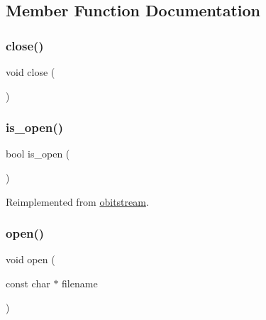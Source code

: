 \subsection{Member Function Documentation}
\mbox{\label{classofbitstream_a5ae591df94fc66ccb85cbb6565368bca}} 
\subsubsection{\texorpdfstring{close()}{close()}}
{\footnotesize\ttfamily void close (\begin{DoxyParamCaption}{ }\end{DoxyParamCaption})}

\mbox{\label{classofbitstream_a2f57f54d8c03b615bb31eee091d8a88a}} 
\subsubsection{\texorpdfstring{is\+\_\+open()}{is\_open()}}
{\footnotesize\ttfamily bool is\+\_\+open (\begin{DoxyParamCaption}{ }\end{DoxyParamCaption})\hspace{0.3cm}{\ttfamily [virtual]}}



Reimplemented from \mbox{\hyperlink{classobitstream_a2f57f54d8c03b615bb31eee091d8a88a}{obitstream}}.

\mbox{\label{classofbitstream_a57f80da790b202b27353cd8f8415b382}} 
\subsubsection{\texorpdfstring{open()}{open()}\hspace{0.1cm}{\footnotesize\ttfamily [1/2]}}
{\footnotesize\ttfamily void open (\begin{DoxyParamCaption}\item[{const char $\ast$}]{filename }\end{DoxyParamCaption})}

\mbox{\label{classofbitstream_a72f6f3d1b9bc5a4275359cc0a83a60bd}} 
